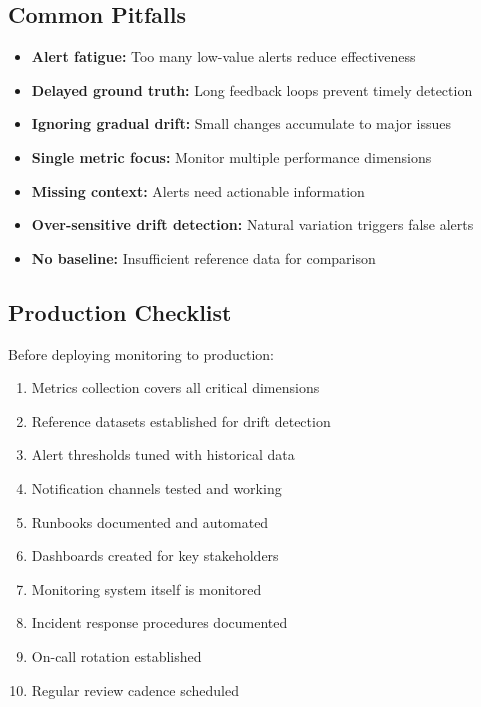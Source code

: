 \subsection{Common Pitfalls}

\begin{itemize}
    \item \textbf{Alert fatigue:} Too many low-value alerts reduce effectiveness
    \item \textbf{Delayed ground truth:} Long feedback loops prevent timely detection
    \item \textbf{Ignoring gradual drift:} Small changes accumulate to major issues
    \item \textbf{Single metric focus:} Monitor multiple performance dimensions
    \item \textbf{Missing context:} Alerts need actionable information
    \item \textbf{Over-sensitive drift detection:} Natural variation triggers false alerts
    \item \textbf{No baseline:} Insufficient reference data for comparison
\end{itemize}

\subsection{Production Checklist}

Before deploying monitoring to production:

\begin{enumerate}
    \item Metrics collection covers all critical dimensions
    \item Reference datasets established for drift detection
    \item Alert thresholds tuned with historical data
    \item Notification channels tested and working
    \item Runbooks documented and automated
    \item Dashboards created for key stakeholders
    \item Monitoring system itself is monitored
    \item Incident response procedures documented
    \item On-call rotation established
    \item Regular review cadence scheduled
\end{enumerate}

